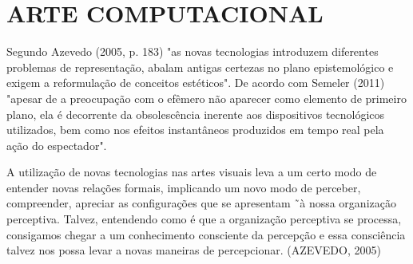%
%

\chapter{ARTE COMPUTACIONAL}

Segundo Azevedo (2005, p. 183) "as novas tecnologias introduzem diferentes problemas de representação, abalam antigas certezas no plano epistemológico e exigem a reformulação de conceitos estéticos". 
De acordo com Semeler (2011) "apesar de a preocupação com o efêmero não aparecer como elemento de primeiro plano, ela é decorrente da obsolescência inerente aos dispositivos tecnológicos utilizados, bem como nos efeitos instantâneos produzidos em tempo real pela ação do espectador". 
								
A utilização de novas tecnologias nas artes visuais leva a um certo modo de entender novas relações formais, implicando um novo modo de perceber, compreender, apreciar as configurações que se apresentam ˜à nossa organização perceptiva. Talvez, entendendo como é que a organização perceptiva se processa, consigamos chegar a um conhecimento consciente da percepção e essa consciência talvez nos possa levar a novas maneiras de percepcionar. (AZEVEDO, 2005)

